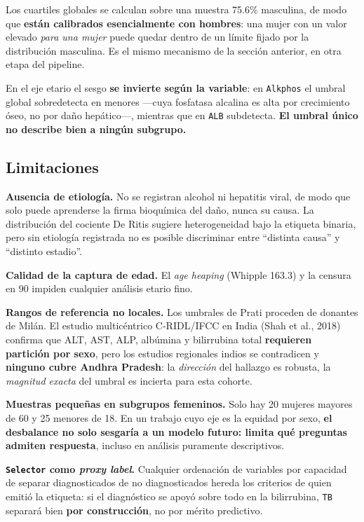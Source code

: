 \documentclass[10pt,a4paper]{article}
\begin{document}
Los cuartiles globales se calculan sobre una muestra 75.6\% masculina, de modo que \textbf{están calibrados esencialmente con hombres}: una mujer con un valor elevado \textit{para una mujer} puede quedar dentro de un límite fijado por la distribución masculina. Es el mismo mecanismo de la sección anterior, en otra etapa del pipeline.

En el eje etario el sesgo \textbf{se invierte según la variable}: en \texttt{Alkphos} el umbral global sobredetecta en menores ---cuya fosfatasa alcalina es alta por crecimiento óseo, no por daño hepático---, mientras que en \texttt{ALB} subdetecta. \textbf{El umbral único no describe bien a ningún subgrupo.}

\subsection{Limitaciones}

\textbf{Ausencia de etiología.} No se registran alcohol ni hepatitis viral, de modo que solo puede aprenderse la firma bioquímica del daño, nunca su causa. La distribución del cociente De Ritis sugiere heterogeneidad bajo la etiqueta binaria, pero sin etiología registrada no es posible discriminar entre ``distinta causa'' y ``distinto estadio''.

\textbf{Calidad de la captura de edad.} El \textit{age heaping} (Whipple 163.3) y la censura en 90 impiden cualquier análisis etario fino.

\textbf{Rangos de referencia no locales.} Los umbrales de Prati proceden de donantes de Milán. El estudio multicéntrico C-RIDL/IFCC en India (Shah et al., 2018) confirma que ALT, AST, ALP, albúmina y bilirrubina total \textbf{requieren partición por sexo}, pero los estudios regionales indios se contradicen y \textbf{ninguno cubre Andhra Pradesh}: la \textit{dirección} del hallazgo es robusta, la \textit{magnitud exacta} del umbral es incierta para esta cohorte.

\textbf{Muestras pequeñas en subgrupos femeninos.} Solo hay 20 mujeres mayores de 60 y 25 menores de 18. En un trabajo cuyo eje es la equidad por sexo, \textbf{el desbalance no solo sesgaría a un modelo futuro: limita qué preguntas admiten respuesta}, incluso en análisis puramente descriptivos.

\textbf{\texttt{Selector} como \textit{proxy label}.} Cualquier ordenación de variables por capacidad de separar diagnosticados de no diagnosticados hereda los criterios de quien emitió la etiqueta: si el diagnóstico se apoyó sobre todo en la bilirrubina, \texttt{TB} separará bien \textbf{por construcción}, no por mérito predictivo.
\end{document}
